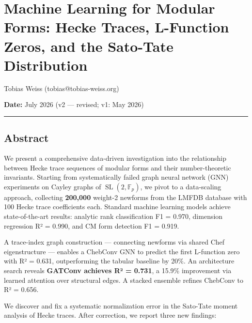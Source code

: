 \documentclass[
]{article}
\author{}
\date{}
\begin{document}
\hypertarget{machine-learning-for-modular-forms-hecke-traces-l-function-zeros-and-the-sato-tate-distribution}{%
\section{Machine Learning for Modular Forms: Hecke Traces, L-Function
Zeros, and the Sato-Tate
Distribution}\label{machine-learning-for-modular-forms-hecke-traces-l-function-zeros-and-the-sato-tate-distribution}}

Tobias Weiss (tobias@tobias-weiss.org)

\textbf{Date:} July 2026 (v2 --- revised; v1: May 2026)

\begin{center}\rule{0.5\linewidth}{0.5pt}\end{center}

\hypertarget{abstract}{%
\subsection{Abstract}\label{abstract}}

We present a comprehensive data-driven investigation into the
relationship between Hecke trace sequences of modular forms and their
number-theoretic invariants. Starting from systematically failed graph
neural network (GNN) experiments on Cayley graphs of
\(\operatorname{SL}(2,\mathbb{F}_p)\), we pivot to a data-scaling
approach, collecting \textbf{200,000} weight-2 newforms from the LMFDB
database with 100 Hecke trace coefficients each. Standard machine
learning models achieve state-of-the-art results: analytic rank
classification F1 = 0.970, dimension regression R² = 0.990, and CM form
detection F1 = 0.919.

A trace-index graph construction --- connecting newforms via shared Chef
eigenstructure --- enables a ChebConv GNN to predict the first
L-function zero with R² = 0.631, outperforming the tabular baseline by
20\%. An architecture search reveals \textbf{GATConv achieves R² =
0.731}, a 15.9\% improvement via learned attention over structural
edges. A stacked ensemble refines ChebConv to R² = 0.656.

We discover and fix a systematic normalization error in the Sato-Tate
moment analysis of Hecke traces. After correction, we report three new
findings:
\end{document}
